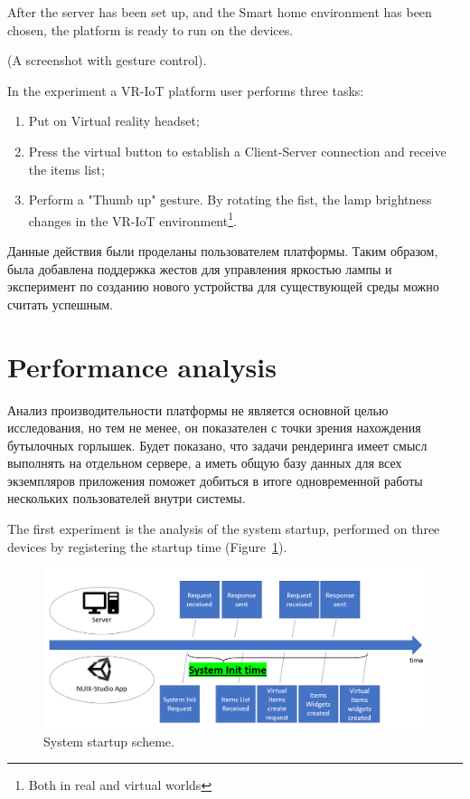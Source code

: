 After the server has been set up, and the Smart home environment has been chosen, the platform is ready to run on the devices.

(A screenshot with gesture control).

In the experiment a VR-IoT platform user performs three tasks:
\begin{enumerate}
    \item Put on Virtual reality headset;
    \item Press the virtual button to establish a Client-Server connection and receive the items list;
    \item Perform a "Thumb up" gesture. By rotating the fist, the lamp brightness changes in the VR-IoT environment\footnote{Both in real and virtual worlds}.
\end{enumerate}

Данные действия были проделаны пользователем платформы. Таким образом, была добавлена поддержка жестов для управления яркостью лампы и эксперимент по созданию нового устройства для существующей среды можно считать успешным. 

\section{Performance analysis}

Анализ производительности платформы не является основной целью исследования, но тем не менее, он показателен с точки зрения нахождения бутылочных горлышек. Будет показано, что задачи рендеринга имеет смысл выполнять на отдельном сервере, а иметь общую базу данных для всех экземпляров приложения поможет добиться в итоге одновременной работы нескольких пользователей внутри системы.

The first experiment is the analysis of the system startup, performed on three devices by registering the startup time (Figure~\ref{fig:SystemStartupScheme-figure}).

\begin{figure}
  \centering
  \includegraphics[width=0.9\linewidth]{figures/SystemStartupScheme.png}
  \caption{System startup scheme.}
  \label{fig:SystemStartupScheme-figure}
\end{figure}

